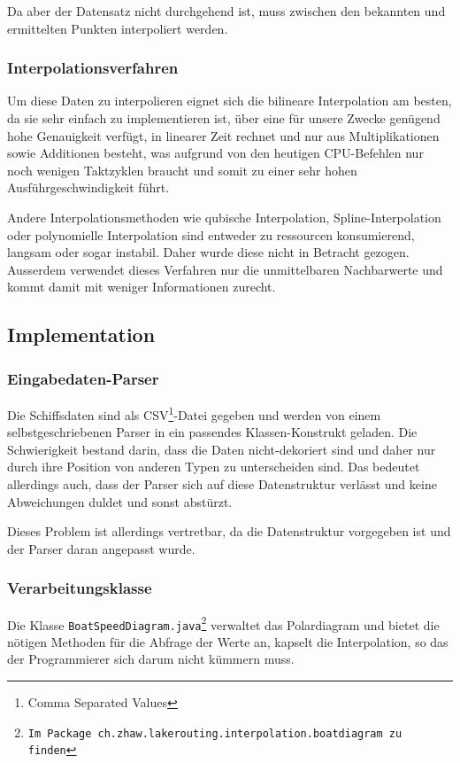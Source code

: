 Da aber der Datensatz nicht durchgehend ist, muss zwischen den bekannten
und ermittelten Punkten interpoliert werden.

\subsubsection{Interpolationsverfahren}
Um diese Daten zu interpolieren eignet sich die bilineare Interpolation
am besten, da sie sehr einfach zu implementieren ist, über eine für
unsere Zwecke genügend hohe Genauigkeit verfügt, in linearer Zeit
rechnet und nur aus Multiplikationen sowie Additionen besteht, was
aufgrund von den heutigen CPU-Befehlen nur noch wenigen Taktzyklen
braucht und somit zu einer sehr hohen Ausführgeschwindigkeit führt.

Andere Interpolationsmethoden wie qubische Interpolation,
Spline-Interpolation oder polynomielle Interpolation sind entweder zu
ressourcen konsumierend, langsam oder sogar instabil. Daher wurde diese
nicht in Betracht gezogen. Ausserdem verwendet dieses Verfahren nur die
unmittelbaren Nachbarwerte und kommt damit mit weniger Informationen
zurecht.

\subsection{Implementation}
\subsubsection{Eingabedaten-Parser}
Die Schiffsdaten sind als CSV\footnote{Comma Separated Values}-Datei
gegeben und werden von einem selbst\-geschriebenen Parser in ein
passendes Klassen-Konstrukt geladen. Die Schwierigkeit bestand darin,
dass die Daten nicht-dekoriert sind und daher nur durch ihre Position
von anderen Typen zu unterscheiden sind. Das bedeutet allerdings auch,
dass der Parser sich auf diese Datenstruktur verlässt und keine
Abweichungen duldet und sonst abstürzt.

Dieses Problem ist allerdings vertretbar, da die Datenstruktur
vorgegeben ist und der Parser daran angepasst wurde.

\subsubsection{Verarbeitungsklasse}
Die Klasse \texttt{BoatSpeedDiagram.java\footnote{Im Package 
ch.zhaw.lakerouting.interpolation.boatdiagram zu finden}} verwaltet das
Polardiagram und bietet die nötigen Methoden für die Abfrage der Werte
an, kapselt die Interpolation, so das der Programmierer sich darum nicht
kümmern muss.

